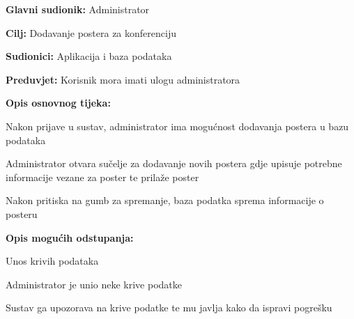 				\noindent {}
				\begin{packed_item}
					
					\item \textbf{Glavni sudionik: } Administrator
					\item  \textbf{Cilj:} Dodavanje postera za konferenciju
					\item  \textbf{Sudionici:} Aplikacija i baza podataka
					\item  \textbf{Preduvjet:} Korisnik mora imati ulogu administratora
					\item  \textbf{Opis osnovnog tijeka:}
					
					\item[] \begin{packed_enum}
						
						\item Nakon prijave u sustav, administrator ima mogućnost dodavanja postera u bazu podataka
						\item Administrator otvara sučelje za dodavanje novih postera gdje upisuje potrebne informacije vezane za poster te prilaže poster
						\item Nakon pritiska na gumb za spremanje, baza podatka sprema informacije o posteru
					\end{packed_enum}
					
					\item  \textbf{Opis mogućih odstupanja:}
					
					\item[] \begin{packed_item}
						
						\item[2.a] Unos krivih podataka
						\item[] \begin{packed_enum}
							
							\item Administrator je unio neke krive podatke
							\item Sustav ga upozorava na krive podatke te mu javlja kako da ispravi pogrešku
							
						\end{packed_enum}
						
						
					\end{packed_item}
				\end{packed_item}
				
